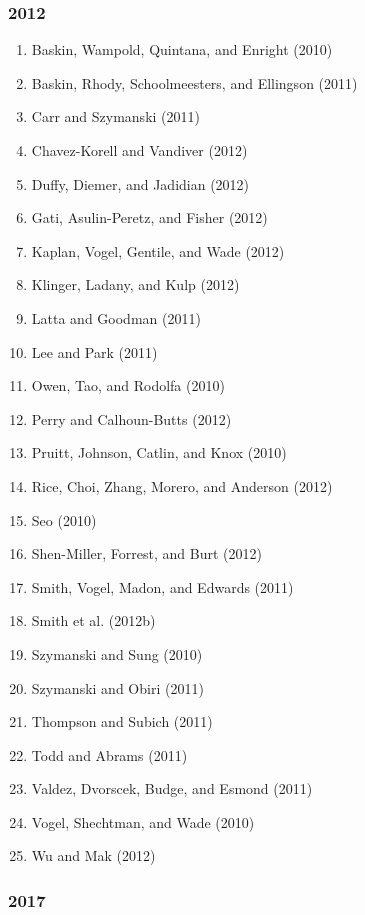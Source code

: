 \documentclass[english,man]{apa6}
\providecommand{\tightlist}{%
  \setlength{\itemsep}{0pt}\setlength{\parskip}{0pt}}
\theoremstyle{definition}
\theoremstyle{definition}
\theoremstyle{definition}
\theoremstyle{remark}
\begin{document}
\subsubsection{2012}\label{section-10}

\begin{enumerate}
\def\labelenumi{\arabic{enumi})}
\tightlist
\item
  Baskin, Wampold, Quintana, and Enright (2010)
\item
  Baskin, Rhody, Schoolmeesters, and Ellingson (2011)
\item
  Carr and Szymanski (2011)
\item
  Chavez-Korell and Vandiver (2012)
\item
  Duffy, Diemer, and Jadidian (2012)
\item
  Gati, Asulin-Peretz, and Fisher (2012)
\item
  Kaplan, Vogel, Gentile, and Wade (2012)
\item
  Klinger, Ladany, and Kulp (2012)
\item
  Latta and Goodman (2011)
\item
  Lee and Park (2011)
\item
  Owen, Tao, and Rodolfa (2010)
\item
  Perry and Calhoun-Butts (2012)
\item
  Pruitt, Johnson, Catlin, and Knox (2010)
\item
  Rice, Choi, Zhang, Morero, and Anderson (2012)
\item
  Seo (2010)
\item
  Shen-Miller, Forrest, and Burt (2012)
\item
  Smith, Vogel, Madon, and Edwards (2011)
\item
  Smith et al. (2012b)
\item
  Szymanski and Sung (2010)
\item
  Szymanski and Obiri (2011)
\item
  Thompson and Subich (2011)
\item
  Todd and Abrams (2011)
\item
  Valdez, Dvorscek, Budge, and Esmond (2011)
\item
  Vogel, Shechtman, and Wade (2010)
\item
  Wu and Mak (2012)
\end{enumerate}

\subsubsection{2017}\label{section-11}
\end{document}
